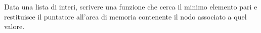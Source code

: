 \begin{Exercise}[label={ex:minimo_pari}]
    Data una lista di interi, scrivere una funzione che cerca il minimo elemento pari e 
    restituisce il puntatore all'area di memoria contenente il nodo associato a quel valore.
\end{Exercise}

\begin{Answer}[ref={ex:minimo_pari}]
  	
\end{Answer}